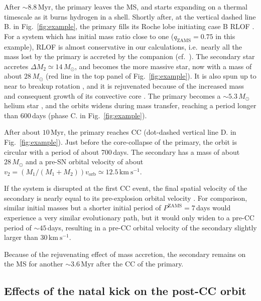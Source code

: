 \documentclass{aa}
\DeclareRobustCommand{\Figref}[1]{Fig.~\ref{#1}}
\begin{document}
After $\sim$8.8\,Myr, the primary leaves
the MS, and starts expanding on a thermal timescale as it burns hydrogen
in a shell. Shortly after, at the vertical dashed line B. in \Figref{fig:example}, the primary fills its Roche lobe
initiating case B
RLOF \citep[][]{kippenhahn:67}.
For a system which has initial mass ratio close to one
($q_\mathrm{ZAMS}=0.75$ in this example),
RLOF is almost conservative in our calculations, i.e.~nearly all the
mass lost by the primary is accreted by the companion (cf.~\citealt{schneider:15}). The
secondary star accretes  $\Delta M_2\simeq14\,M_\odot$, and becomes the
more massive star, now with a mass of about $28\,M_\odot$ (red line in the top
panel of \Figref{fig:example}). It is also spun up to
near to breakup rotation \citep[][]{packet:81,demink:09}, and it is rejuvenated because of the increased
mass and consequent growth of its convective core
\citep[][]{hellings:83,schneider:16}. The primary  becomes
a $\sim$$5.3\,M_\odot$ helium star \citep[][]{gotberg:17, gotberg:18}, and
the orbits widens during mass transfer, reaching a period
longer than 600\,days (phase C. in \Figref{fig:example}). 

After about $10$\,Myr, the primary reaches CC (dot-dashed vertical line
D. in \Figref{fig:example}). Just before the core-collapse
of the primary, the orbit is circular with a period of
 about 700\,days. The secondary has a mass of about $28\,M_\odot$ and a pre-SN orbital velocity of
about $v_2 = (M_1/(M_1+M_2))v_\mathrm{orb} \simeq 12.5\,\mathrm{km\ s^{-1}}$.

If the system is disrupted at the first CC event, the final spatial velocity of the
secondary is nearly equal to its pre-explosion orbital velocity
\citep[e.g.,][]{blaauw:61,eldridge:11}. For comparison, similar
initial masses but a shorter initial period of $P^\mathrm{ZAMS}=7$\,days would experience a very similar
evolutionary path, but it would only widen to a pre-CC period of
$\sim$$45$\,days, resulting in a pre-CC orbital velocity of the
secondary slightly larger than $30\,\mathrm{km\  s^{-1}}$.

Because of the rejuvenating effect of
mass accretion,
the secondary remains on the MS for another $\sim$$3.6\,\mathrm{Myr}$ after
the CC of the primary.

\subsection{Effects of the natal kick on the post-CC orbit}
\label{sec:example_kick}
\end{document}
